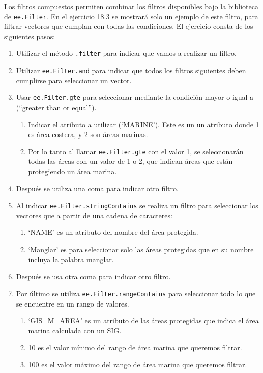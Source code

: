 \documentclass[
  12pt,
  letterpaper,
  twoside]{book}
\providecommand{\tightlist}{%
  \setlength{\itemsep}{0pt}\setlength{\parskip}{0pt}}
\begin{document}
Los filtros compuestos permiten combinar los filtros disponibles bajo la biblioteca de \texttt{ee.Filter}. En el ejercicio 18.3 se mostrará solo un ejemplo de este filtro, para filtrar vectores que cumplan con todas las condiciones. El ejercicio consta de los siguientes pasos:

\begin{enumerate}
\def\labelenumi{\arabic{enumi}.}
\tightlist
\item
  Utilizar el método \texttt{.filter} para indicar que vamos a realizar un filtro.
\item
  Utilizar \texttt{ee.Filter.and} para indicar que todos los filtros siguientes deben cumplirse para seleccionar un vector.
\item
  Usar \texttt{ee.Filter.gte} para seleccionar mediante la condición mayor o igual a (``greater than or equal'').

  \begin{enumerate}
  \def\labelenumii{\alph{enumii}.}
  \tightlist
  \item
    Indicar el atributo a utilizar (`MARINE'). Este es un un atributo donde 1 es área costera, y 2 son áreas marinas.
  \item
    Por lo tanto al llamar \texttt{ee.Filter.gte} con el valor 1, se seleccionarán todas las áreas con un valor de 1 o 2, que indican áreas que están protegiendo un área marina.
  \end{enumerate}
\item
  Después se utiliza una coma para indicar otro filtro.
\item
  Al indicar \texttt{ee.Filter.stringContains} se realiza un filtro para seleccionar los vectores que a partir de una cadena de caracteres:

  \begin{enumerate}
  \def\labelenumii{\alph{enumii}.}
  \tightlist
  \item
    `NAME' es un atributo del nombre del área protegida.
  \item
    `Manglar' es para seleccionar solo las áreas protegidas que en su nombre incluya la palabra manglar.
  \end{enumerate}
\item
  Después se usa otra coma para indicar otro filtro.
\item
  Por último se utiliza \texttt{ee.Filter.rangeContains} para seleccionar todo lo que se encuentre en un rango de valores.

  \begin{enumerate}
  \def\labelenumii{\alph{enumii}.}
  \tightlist
  \item
    `GIS\_M\_AREA' es un atributo de las áreas protegidas que indica el área marina calculada con un SIG.
  \item
    10 es el valor mínimo del rango de área marina que queremos filtrar.
  \item
    100 es el valor máximo del rango de área marina que queremos filtrar.
  \end{enumerate}
\end{enumerate}
\end{document}

